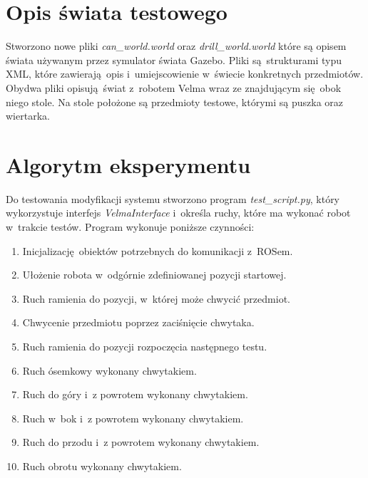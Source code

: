 \section{Opis świata testowego}
Stworzono nowe pliki \textit{can\_world.world} oraz \textit{drill\_world.world} które są opisem świata używanym przez symulator świata Gazebo. Pliki są strukturami typu XML, które zawierają opis i~umiejscowienie w~świecie konkretnych przedmiotów. Obydwa pliki opisują świat z~robotem Velma wraz ze znajdującym się obok niego stole. Na stole położone są przedmioty testowe, którymi są puszka oraz wiertarka.

\section{Algorytm eksperymentu}
Do testowania modyfikacji systemu stworzono program \textit{test\_script.py}, który wykorzystuje interfejs \textit{VelmaInterface} i~określa ruchy, które ma wykonać robot w~trakcie testów. Program wykonuje poniższe czynności:
\begin{enumerate}
	\item Inicjalizację obiektów potrzebnych do komunikacji z~ROSem.
	\item Ułożenie robota w~odgórnie zdefiniowanej pozycji startowej.
	\item Ruch ramienia do pozycji, w~której może chwycić przedmiot.
	\item Chwycenie przedmiotu poprzez zaciśnięcie chwytaka.
	\item Ruch ramienia do pozycji rozpoczęcia następnego testu.
	\item Ruch ósemkowy wykonany chwytakiem.
	\item Ruch do góry i~z powrotem wykonany chwytakiem.
	\item Ruch w~bok i~z powrotem wykonany chwytakiem.
	\item Ruch do przodu i~z powrotem wykonany chwytakiem.
	\item Ruch obrotu wykonany chwytakiem. 
\end{enumerate}
